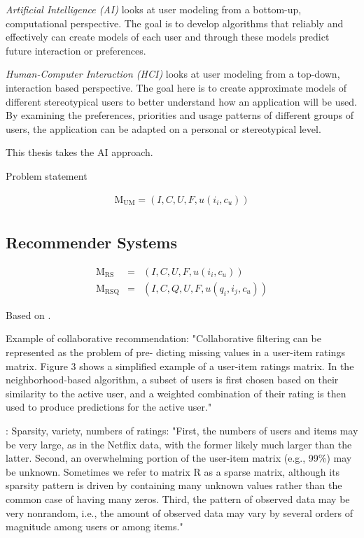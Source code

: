 \emph{Artificial Intelligence (AI)} looks at user modeling from a bottom-up, computational perspective. 
The goal is to develop algorithms that reliably and effectively can create models of each user
and through these models predict future interaction or preferences. 

\emph{Human-Computer Interaction (HCI)} looks at user modeling from a top-down, interaction based perspective.
The goal here is to create approximate models of different stereotypical users to better understand how 
an application will be used. By examining the preferences, priorities and usage patterns of different groups
of users, the application can be adapted on a personal or stereotypical level.

This thesis takes the AI approach.

Problem statement

\begin{eqnarray}
  \mathrm{M_{UM}} = (I, C, U, F, u(i_i, c_u))\\
\end{eqnarray}

\subsection{Recommender Systems}

\begin{eqnarray}
  \mathrm{M_{RS}}   &=& (I, C, U, F,    u(i_i, c_u))\\
  \mathrm{M_{RSQ}}  &=& (I, C, Q, U, F, u(q_i, i_j, c_u))
\end{eqnarray}

Based on \cite[p2]{Adomavicius2005}.


\cite[p5]{Sugiyama2004} Example of collaborative recommendation: 
"Collaborative filtering can be represented as the problem of pre- dicting missing values in a user-item ratings matrix. Figure 3 shows a simplified example of a user-item ratings matrix.
In the neighborhood-based algorithm, a subset of users is first chosen based on their similarity to the active user, and a weighted combination of their rating is then used to produce predictions for the active user."

\cite[p2]{Bell2007b}: Sparsity, variety, numbers of ratings:
"First, the numbers of users and items may be very large, as in the Netflix data, with the former likely much larger than the latter.
Second, an overwhelming portion of the user-item matrix (e.g., 99\%) may be unknown. Sometimes we refer to matrix R as a sparse matrix, although its sparsity pattern is driven by containing many unknown values rather than the common case of having many zeros.
Third, the pattern of observed data may be very nonrandom, i.e., the amount of observed data may vary by several orders of magnitude among users or among items."

